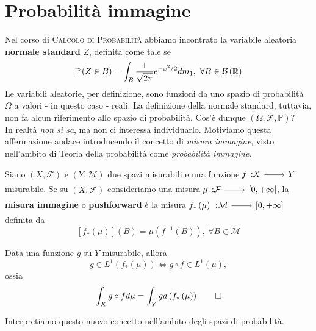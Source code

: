 \section{Probabilità immagine}\label{probimm}
Nel corso di \textsc{Calcolo di Probabilità} abbiamo incontrato la variabile aleatoria \textbf{normale standard} $Z$, definita come tale se
\begin{equation}
	\mathbb{P}\left(Z\in B\right)=\int_{B}\frac{1}{\sqrt{2\pi}}e^{-x^2/2}dm_1,\ \forall B\in\mathcal{B}\left(\mathbb{R}\right)
\end{equation}
Le variabili aleatorie, per definizione, sono funzioni da uno spazio di probabilità $\Omega$ a valori - in questo caso - reali. La definizione della normale standard, tuttavia, non fa alcun riferimento allo spazio di probabilità. Cos'è dunque  $\left(\Omega,\mathcal{F},\mathbb{P}\right)$?\\
In realtà \textit{non si sa}, ma non ci interessa individuarlo. Motiviamo questa affermazione audace introducendo il concetto di \textit{misura immagine}, visto nell'ambito di Teoria della probabilità come \textit{probabilità immagine}.
\begin{define}
	Siano $\left(X,\mathcal{F}\right)$ e $\left(Y,\mathcal{M}\right)$ due spazi misurabili e una funzione $\funz{f}{X}{Y}$ misurabile. Se su $\left(X,\mathcal{F}\right)$ consideriamo una misura $\funz{\mu}{\mathcal{F}}{\left[0,+\infty\right]}$, la \textbf{misura immagine} o \textbf{pushforward} è la misura $\funz{f_{\ast}\left(\mu\right)}{\mathcal{M}}{\left[0,+\infty\right]}$ definita da
	\begin{equation}
		\left[f_{\ast}\left(\mu\right)\right]\left(B\right)=\mu\left(f^{-1}\left(B\right)\right),\ \forall B\in \mathcal{M}
	\end{equation}
\end{define}
\begin{theoremaqed}
	Data una funzione $g$ su $Y$ misurabile, allora
	\begin{equation}
		g\in L^{1}\left(f_{\ast}\left(\mu\right)\right)\iff g\circ f\in L^{1}\left(\mu\right),
	\end{equation}
	ossia
	\begin{equation}
		\int_{X}g\circ fd\mu=\int_{Y}gd\left(f_{\ast}\left(\mu\right)\right)\qedhere
	\end{equation}
\end{theoremaqed}
Interpretiamo questo nuovo concetto nell'ambito degli spazi di probabilità.
